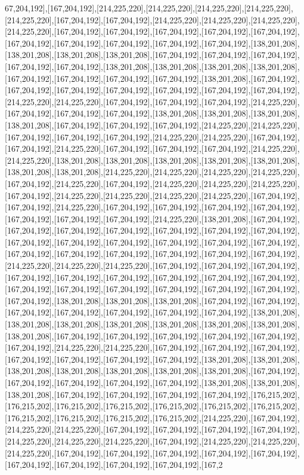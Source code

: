 67,204,192],[167,204,192],[214,225,220],[214,225,220],[214,225,220],[214,225,220],[214,225,220],[167,204,192],[167,204,192],[214,225,220],[214,225,220],[214,225,220],[214,225,220],[167,204,192],[167,204,192],[167,204,192],[167,204,192],[167,204,192],[167,204,192],[167,204,192],[167,204,192],[167,204,192],[167,204,192],[138,201,208],[138,201,208],[138,201,208],[138,201,208],[167,204,192],[167,204,192],[167,204,192],[167,204,192],[167,204,192],[138,201,208],[138,201,208],[138,201,208],[138,201,208],[167,204,192],[167,204,192],[167,204,192],[167,204,192],[138,201,208],[167,204,192],[167,204,192],[167,204,192],[167,204,192],[167,204,192],[167,204,192],[167,204,192],[214,225,220],[214,225,220],[167,204,192],[167,204,192],[167,204,192],[214,225,220],[167,204,192],[167,204,192],[167,204,192],[138,201,208],[138,201,208],[138,201,208],[138,201,208],[167,204,192],[167,204,192],[167,204,192],[214,225,220],[214,225,220],[167,204,192],[167,204,192],[167,204,192],[214,225,220],[214,225,220],[167,204,192],[167,204,192],[214,225,220],[167,204,192],[167,204,192],[167,204,192],[214,225,220],[214,225,220],[138,201,208],[138,201,208],[138,201,208],[138,201,208],[138,201,208],[138,201,208],[138,201,208],[214,225,220],[214,225,220],[214,225,220],[214,225,220],[167,204,192],[214,225,220],[167,204,192],[214,225,220],[214,225,220],[214,225,220],[167,204,192],[214,225,220],[214,225,220],[214,225,220],[214,225,220],[167,204,192],[167,204,192],[214,225,220],[167,204,192],[167,204,192],[167,204,192],[167,204,192],[167,204,192],[167,204,192],[167,204,192],[214,225,220],[138,201,208],[167,204,192],[167,204,192],[167,204,192],[167,204,192],[167,204,192],[167,204,192],[167,204,192],[167,204,192],[167,204,192],[167,204,192],[167,204,192],[167,204,192],[167,204,192],[167,204,192],[167,204,192],[167,204,192],[167,204,192],[167,204,192],[167,204,192],[214,225,220],[214,225,220],[214,225,220],[167,204,192],[167,204,192],[167,204,192],[167,204,192],[167,204,192],[167,204,192],[167,204,192],[167,204,192],[167,204,192],[167,204,192],[167,204,192],[167,204,192],[167,204,192],[167,204,192],[167,204,192],[167,204,192],[138,201,208],[138,201,208],[138,201,208],[167,204,192],[167,204,192],[167,204,192],[167,204,192],[167,204,192],[167,204,192],[167,204,192],[138,201,208],[138,201,208],[138,201,208],[138,201,208],[138,201,208],[138,201,208],[138,201,208],[138,201,208],[167,204,192],[167,204,192],[167,204,192],[167,204,192],[167,204,192],[167,204,192],[214,225,220],[214,225,220],[167,204,192],[167,204,192],[167,204,192],[167,204,192],[167,204,192],[167,204,192],[167,204,192],[138,201,208],[138,201,208],[138,201,208],[138,201,208],[138,201,208],[138,201,208],[138,201,208],[167,204,192],[167,204,192],[167,204,192],[167,204,192],[167,204,192],[138,201,208],[138,201,208],[138,201,208],[167,204,192],[167,204,192],[167,204,192],[167,204,192],[176,215,202],[176,215,202],[176,215,202],[176,215,202],[176,215,202],[176,215,202],[176,215,202],[176,215,202],[176,215,202],[176,215,202],[176,215,202],[214,225,220],[167,204,192],[214,225,220],[214,225,220],[167,204,192],[167,204,192],[167,204,192],[167,204,192],[214,225,220],[214,225,220],[214,225,220],[167,204,192],[214,225,220],[214,225,220],[214,225,220],[167,204,192],[167,204,192],[167,204,192],[167,204,192],[167,204,192],[167,204,192],[167,204,192],[167,204,192],[167,204,192],[167,2